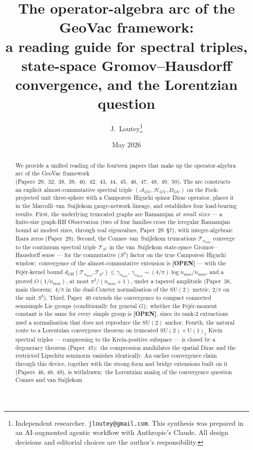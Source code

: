 \documentclass[11pt,a4paper]{article}
\title{The operator-algebra arc of the GeoVac framework:\\
a reading guide for spectral triples, state-space Gromov--Hausdorff
convergence, and the Lorentzian question}
\author{J.~Loutey\thanks{Independent researcher.
\texttt{jloutey@gmail.com}.
This synthesis was prepared in an AI-augmented agentic workflow with
Anthropic's Claude.  All design decisions and editorial choices are
the author's responsibility.}}
\date{May 2026}
\theoremstyle{plain}
\theoremstyle{definition}
\newcommand{\nmax}{n_{\max}}
\newcommand{\sthree}{S^{3}}
\newcommand{\HGV}{\mathcal{H}_{\mathrm{GV}}}
\newcommand{\AGV}{\mathcal{A}_{\mathrm{GV}}}
\newcommand{\DGV}{D_{\mathrm{GV}}}
\newcommand{\Tcal}{\mathcal{T}}
\newcommand{\SU}{\mathrm{SU}}
\newcommand{\Uone}{\mathrm{U}(1)}
\newcommand{\gvc}[2]{#2}
\begin{document}
\maketitle

\begin{abstract}
We provide a unified reading of the fourteen papers that make up the
operator-algebra arc of the GeoVac framework
(Papers~29,~32,~38,~39,~40,~42,~43,~44,~45,~46,~47,~48,~49,~50).  The arc constructs an
explicit almost-commutative spectral triple
$(\AGV, \HGV, \DGV)$ on the Fock-projected unit three-sphere with a
Camporesi--Higuchi spinor Dirac operator, places it in the
Marcolli--van~Suijlekom gauge-network lineage, and establishes four
load-bearing results.  First, the underlying truncated graphs are
Ramanujan \emph{at small sizes} --- a finite-size graph-RH Observation
(two of four families cross the irregular Ramanujan bound at modest sizes, through real eigenvalues,
Paper~29~\S7), with integer-algebraic Ihara zeros (Paper~29).  Second, \gvc{wh1-p38-gh-convergence}{the
Connes--van~Suijlekom truncations $\Tcal_{\nmax}$ converge to the
continuum spectral triple $\Tcal_{\sthree}$ in the van~Suijlekom
state-space Gromov--Hausdorff sense --- for the commutative ($S^3$)
factor on the true Camporesi--Higuchi window;\ convergence of the
almost-commutative extension is \textbf{[OPEN]}} --- \gvc{p38-rate-constant}{with the Fej\'er-kernel bound
$d_{\mathrm{GH}}(\Tcal_{\nmax}, \Tcal_{\sthree}) \le \gamma_{\nmax}$,
$\gamma_{\nmax} \sim (4/\pi)\log\nmax/\nmax$, and a proved $O(1/\nmax)$, at most $\pi^2/(\nmax+1)$, under a tapered amplitude (Paper~38, main theorem;\ $4/\pi$ in the dual-Coxeter
normalisation of the $\SU(2)$ metric, $2/\pi$ on the unit $S^3$)}.
Third, Paper~40 extends the convergence to compact connected
semisimple Lie groups (conditionally for general $G$);\ whether the
Fej\'er-moment constant is the same for every simple group is
\textbf{[OPEN]}, since its rank-2 extractions used a normalisation
that does not reproduce the $\SU(2)$ anchor.  Fourth, the natural route to a Lorentzian convergence theorem on
truncated $\SU(2)\times\Uone_{t}$ Krein spectral triples ---
compressing to the Krein-positive subspace --- is closed by a
degeneracy theorem (Paper~45):\ the compression annihilates the
spatial Dirac and the restricted Lipschitz seminorm vanishes
identically.  An earlier convergence claim through this device,
together with the strong-form and bridge extensions built on it
(Papers~46, 48, 49), is withdrawn;\ the Lorentzian analog of the
convergence question Connes and van Suijlekom \cite{connes_vs2021}

\end{abstract}
\end{document}
